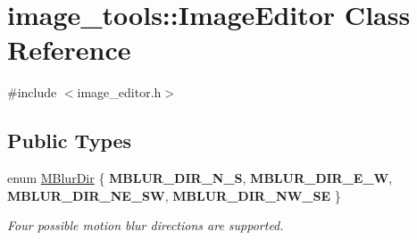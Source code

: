 \hypertarget{classimage__tools_1_1ImageEditor}{}\section{image\+\_\+tools\+:\+:Image\+Editor Class Reference}
\label{classimage__tools_1_1ImageEditor}


{\ttfamily \#include $<$image\+\_\+editor.\+h$>$}

\subsection*{Public Types}
\begin{DoxyCompactItemize}
\item 
\mbox{\label{classimage__tools_1_1ImageEditor_a20bacf2756f1b97eed82d2fee9628ac2}} 
enum \hyperlink{classimage__tools_1_1ImageEditor_a20bacf2756f1b97eed82d2fee9628ac2}{M\+Blur\+Dir} \{ {\bfseries M\+B\+L\+U\+R\+\_\+\+D\+I\+R\+\_\+\+N\+\_\+S}, 
{\bfseries M\+B\+L\+U\+R\+\_\+\+D\+I\+R\+\_\+\+E\+\_\+W}, 
{\bfseries M\+B\+L\+U\+R\+\_\+\+D\+I\+R\+\_\+\+N\+E\+\_\+\+SW}, 
{\bfseries M\+B\+L\+U\+R\+\_\+\+D\+I\+R\+\_\+\+N\+W\+\_\+\+SE}
 \}\begin{DoxyCompactList}\small\item\em Four possible motion blur directions are supported. \end{DoxyCompactList}
\end{DoxyCompactItemize}
